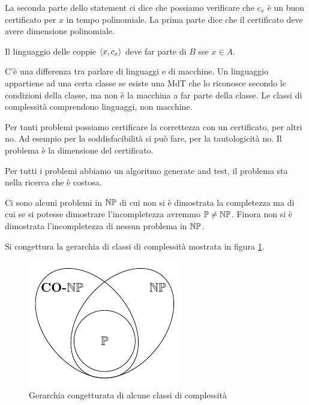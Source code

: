 La seconda parte dello statement ci dice che possiamo verificare che $c_{x}$ è un buon certificato per
$x$ in tempo polinomiale. La prima parte dice che il certificato deve avere dimensione polinomiale.

Il linguaggio delle coppie $\langle x, c_{x} \rangle$ deve far parte di $B$ sse $x \in A$. 

C'è una differenza tra parlare di linguaggi e di macchine. Un linguaggio appartiene ad una certa
classe se esiste una MdT che lo riconosce secondo le condizioni della classe, ma non è la macchina
a far parte della classe. Le classi di complessità comprendono linguaggi, non macchine.

Per tanti problemi possiamo certificare la correttezza con un certificato, per altri no. Ad esempio
per la soddisfacibilità si può fare, per la tautologicità no. Il problema è la dimensione del
certificato.

Per tutti i problemi abbiamo un algoritmo generate and test, il problema sta nella ricerca che è
costosa.


Ci sono alcuni problemi in $\mathbb{NP}$ di cui non si è dimostrata la completezza ma di cui se si potesse
dimostrare l'incompletezza avremmo $\mathbb{P} \not= \mathbb{NP}$. Finora non si è dimostrata l'incompletezza di
nessun problema in $\mathbb{NP}$.


Si congettura la gerarchia di classi di complessità mostrata in figura \ref{ConjecturedHierarchy}.

\begin{figure}[h]
    \begin{center}
        \includegraphics{./img/complexity_intro/NPCONP.pdf}
    \end{center}
    \caption{Gerarchia congetturata di alcune classi di complessità}
    \label{ConjecturedHierarchy}
\end{figure}

